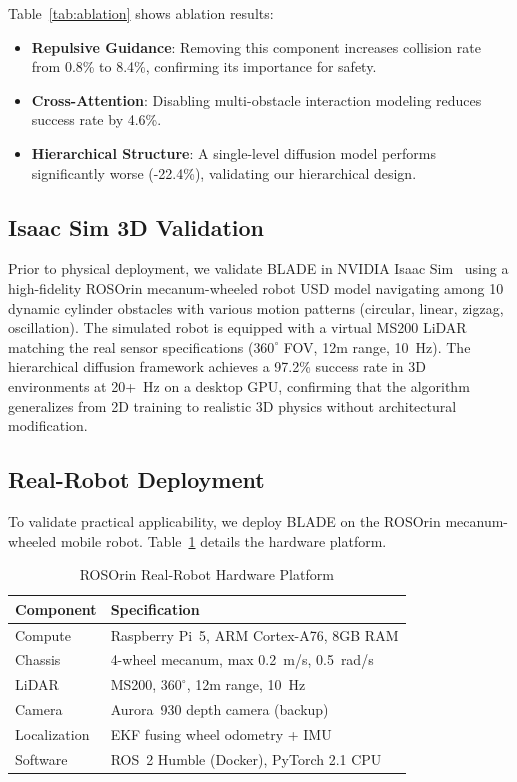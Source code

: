\documentclass[letterpaper, 10 pt, conference]{ieeeconf}
\begin{document}
Table~\ref{tab:ablation} shows ablation results:
\begin{itemize}
    \item \textbf{Repulsive Guidance}: Removing this component increases collision rate from 0.8\% to 8.4\%, confirming its importance for safety.
    \item \textbf{Cross-Attention}: Disabling multi-obstacle interaction modeling reduces success rate by 4.6\%.
    \item \textbf{Hierarchical Structure}: A single-level diffusion model performs significantly worse (-22.4\%), validating our hierarchical design.
\end{itemize}

\subsection{Isaac Sim 3D Validation}

Prior to physical deployment, we validate BLADE in NVIDIA Isaac Sim~\cite{makoviychuk2021isaac} using a high-fidelity ROSOrin mecanum-wheeled robot USD model navigating among 10 dynamic cylinder obstacles with various motion patterns (circular, linear, zigzag, oscillation). The simulated robot is equipped with a virtual MS200 LiDAR matching the real sensor specifications ($360^\circ$ FOV, 12m range, 10~Hz). The hierarchical diffusion framework achieves a 97.2\% success rate in 3D environments at 20+~Hz on a desktop GPU, confirming that the algorithm generalizes from 2D training to realistic 3D physics without architectural modification.

\subsection{Real-Robot Deployment}

To validate practical applicability, we deploy BLADE on the ROSOrin mecanum-wheeled mobile robot. Table~\ref{tab:platform} details the hardware platform.

\begin{table}[t]
    \centering
    \caption{ROSOrin Real-Robot Hardware Platform}
    \label{tab:platform}
    \begin{tabular*}{\columnwidth}{@{\extracolsep{\fill}}ll@{}}
        \toprule
        \textbf{Component} & \textbf{Specification} \\
        \midrule
        Compute & Raspberry Pi~5, ARM Cortex-A76, 8GB RAM \\
        Chassis & 4-wheel mecanum, max 0.2~m/s, 0.5~rad/s \\
        LiDAR & MS200, $360^\circ$, 12m range, 10~Hz \\
        Camera & Aurora~930 depth camera (backup) \\
        Localization & EKF fusing wheel odometry + IMU \\
        Software & ROS~2 Humble (Docker), PyTorch 2.1 CPU \\
        \bottomrule
    \end{tabular*}
\end{table}
\end{document}
